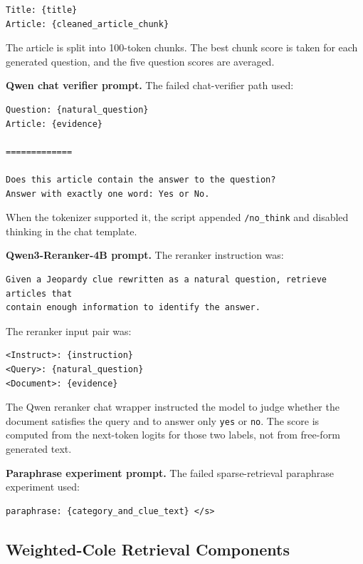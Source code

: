 \documentclass[11pt]{article}
\begin{document}
\begin{verbatim}
Title: {title}
Article: {cleaned_article_chunk}
\end{verbatim}

The article is split into 100-token chunks. The best chunk score is taken for each generated question, and the five question scores are averaged.

\textbf{Qwen chat verifier prompt.} The failed chat-verifier path used:

\begin{verbatim}
Question: {natural_question}
Article: {evidence}

=============

Does this article contain the answer to the question?
Answer with exactly one word: Yes or No.
\end{verbatim}

When the tokenizer supported it, the script appended \texttt{/no\_think} and disabled thinking in the chat template.

\textbf{Qwen3-Reranker-4B prompt.} The reranker instruction was:

\begin{verbatim}
Given a Jeopardy clue rewritten as a natural question, retrieve articles that
contain enough information to identify the answer.
\end{verbatim}

The reranker input pair was:

\begin{verbatim}
<Instruct>: {instruction}
<Query>: {natural_question}
<Document>: {evidence}
\end{verbatim}

The Qwen reranker chat wrapper instructed the model to judge whether the document satisfies the query and to answer only \texttt{yes} or \texttt{no}. The score is computed from the next-token logits for those two labels, not from free-form generated text.

\textbf{Paraphrase experiment prompt.} The failed sparse-retrieval paraphrase experiment used:

\begin{verbatim}
paraphrase: {category_and_clue_text} </s>
\end{verbatim}

\subsection{Weighted-Cole Retrieval Components}
\end{document}
